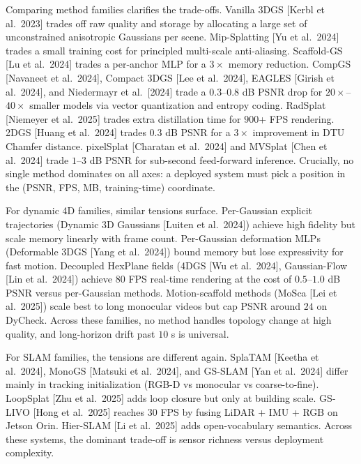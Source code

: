 Comparing method families clarifies the trade-offs. Vanilla 3DGS {[}Kerbl et al.~2023{]} trades off raw quality and storage by allocating a large set of unconstrained anisotropic Gaussians per scene. Mip-Splatting {[}Yu et al.~2024{]} trades a small training cost for principled multi-scale anti-aliasing. Scaffold-GS {[}Lu et al.~2024{]} trades a per-anchor MLP for a \(3{\times}\) memory reduction. CompGS {[}Navaneet et al.~2024{]}, Compact 3DGS {[}Lee et al.~2024{]}, EAGLES {[}Girish et al.~2024{]}, and Niedermayr et al.~{[}2024{]} trade a \(0.3\)--\(0.8\) dB PSNR drop for \(20{\times}\)--\(40{\times}\) smaller models via vector quantization and entropy coding. RadSplat {[}Niemeyer et al.~2025{]} trades extra distillation time for \(900\)+ FPS rendering. 2DGS {[}Huang et al.~2024{]} trades \(0.3\) dB PSNR for a \(3{\times}\) improvement in DTU Chamfer distance. pixelSplat {[}Charatan et al.~2024{]} and MVSplat {[}Chen et al.~2024{]} trade \(1\)--\(3\) dB PSNR for sub-second feed-forward inference. Crucially, no single method dominates on all axes: a deployed system must pick a position in the (PSNR, FPS, MB, training-time) coordinate.

For dynamic 4D families, similar tensions surface. Per-Gaussian explicit trajectories (Dynamic 3D Gaussians {[}Luiten et al.~2024{]}) achieve high fidelity but scale memory linearly with frame count. Per-Gaussian deformation MLPs (Deformable 3DGS {[}Yang et al.~2024{]}) bound memory but lose expressivity for fast motion. Decoupled HexPlane fields (4DGS {[}Wu et al.~2024{]}, Gaussian-Flow {[}Lin et al.~2024{]}) achieve \(80\) FPS real-time rendering at the cost of \(0.5\)--\(1.0\) dB PSNR versus per-Gaussian methods. Motion-scaffold methods (MoSca {[}Lei et al.~2025{]}) scale best to long monocular videos but cap PSNR around \(24\) on DyCheck. Across these families, no method handles topology change at high quality, and long-horizon drift past \(10\) s is universal.

For SLAM families, the tensions are different again. SplaTAM {[}Keetha et al.~2024{]}, MonoGS {[}Matsuki et al.~2024{]}, and GS-SLAM {[}Yan et al.~2024{]} differ mainly in tracking initialization (RGB-D vs monocular vs coarse-to-fine). LoopSplat {[}Zhu et al.~2025{]} adds loop closure but only at building scale. GS-LIVO {[}Hong et al.~2025{]} reaches \(30\) FPS by fusing LiDAR + IMU + RGB on Jetson Orin. Hier-SLAM {[}Li et al.~2025{]} adds open-vocabulary semantics. Across these systems, the dominant trade-off is sensor richness versus deployment complexity.


